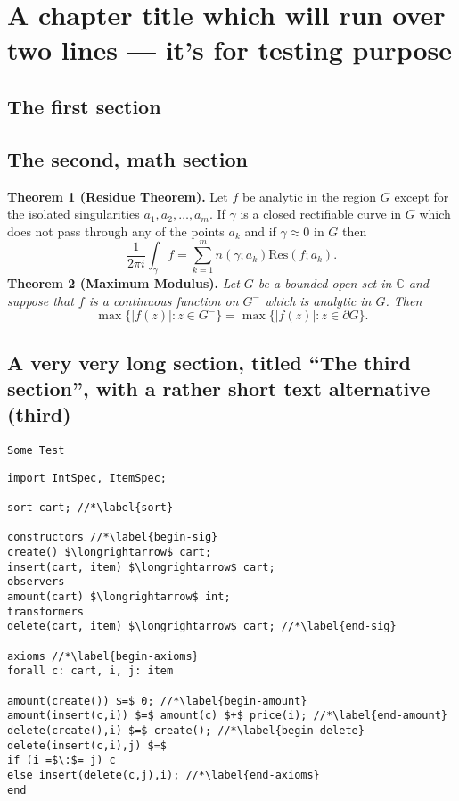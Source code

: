 \documentclass[mscthesis]{usiinfthesis}
\begin{document}
\chapter[Short title]{A chapter title which will run over two lines --- it's for
  testing purpose}

\section{The first section}

\section{The second, math section}

\textbf{Theorem 1 (Residue Theorem).}
Let $f$ be analytic in the region $G$ except for the isolated singularities $a_1,a_2,\ldots,a_m$. If $\gamma$ is a closed rectifiable curve in $G$ which does not pass through any of the points $a_k$ and if $\gamma\approx 0$ in $G$ then
\[
  \frac{1}{2\pi i}\int_\gamma f = \sum_{k=1}^m n(\gamma;a_k) \text{Res}(f;a_k).
\]
\textbf{Theorem 2 (Maximum Modulus).}
\emph{Let $G$ be a bounded open set in $\mathbb{C}$ and suppose that $f$ is a continuous function on $G^-$ which is analytic in $G$. Then}
\[
  \max\{|f(z)|:z\in G^-\}=\max \{|f(z)|:z\in \partial G \}.
\]

\section[third]{A very very long section, titled ``The third section'', with
  a rather  short text alternative (third)}

\texttt{Some Test}
\begin{lstlisting}
import IntSpec, ItemSpec;

sort cart; //*\label{sort}

constructors //*\label{begin-sig}
create() $\longrightarrow$ cart;
insert(cart, item) $\longrightarrow$ cart;
observers
amount(cart) $\longrightarrow$ int;
transformers
delete(cart, item) $\longrightarrow$ cart; //*\label{end-sig}

axioms //*\label{begin-axioms}
forall c: cart, i, j: item 

amount(create()) $=$ 0; //*\label{begin-amount}
amount(insert(c,i)) $=$ amount(c) $+$ price(i); //*\label{end-amount}
delete(create(),i) $=$ create(); //*\label{begin-delete}
delete(insert(c,i),j) $=$
if (i =$\:$= j) c
else insert(delete(c,j),i); //*\label{end-axioms}
end
\end{lstlisting}
\end{document}
